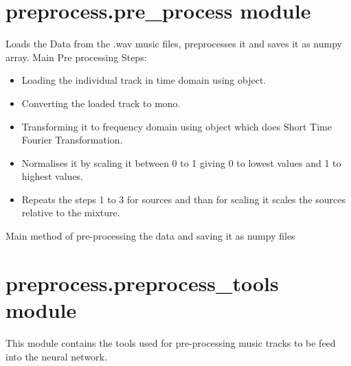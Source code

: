 \documentclass[letterpaper,10pt,english,openany,oneside]{sphinxmanual}
\begin{document}
\section{preprocess.pre\_process module}
\label{\detokenize{docs/source/preprocess:module-preprocess.pre_process}}\label{\detokenize{docs/source/preprocess:preprocess-pre-process-module}}
Loads the Data from the .wav music files, preprocesses it and saves it as numpy array.
Main Pre processing Steps:
\begin{itemize}
\item {} 
Loading the individual track in time domain using  object.

\item {} 
Converting the loaded track to mono.

\item {} 
Transforming it to frequency domain using  object which does Short Time Fourier Transformation.

\item {} 
Normalises it by scaling it between 0 to 1 giving 0 to lowest values and 1 to highest values.

\item {} 
Repeats the steps 1 to 3 for sources and than for scaling it scales the sources relative to the mixture.

\end{itemize}

\begin{fulllineitems}
\label{\detokenize{docs/source/preprocess:preprocess.pre_process.main}}
Main method of pre-processing the data and saving it as numpy files

\end{fulllineitems}



\section{preprocess.preprocess\_tools module}
\label{\detokenize{docs/source/preprocess:module-preprocess.preprocess_tools}}\label{\detokenize{docs/source/preprocess:preprocess-preprocess-tools-module}}
This module contains the tools used for pre-processing music tracks to be feed into the neural network.
\end{document}

